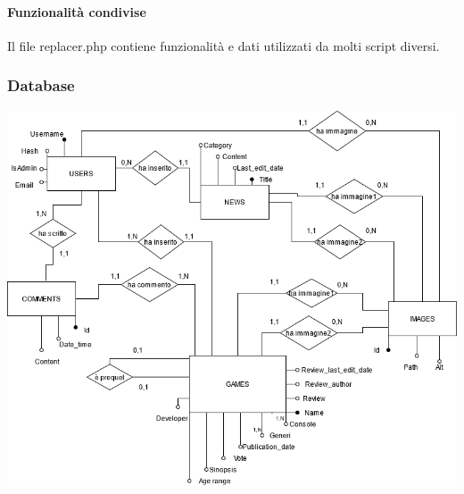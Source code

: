 \paragraph{Funzionalità condivise}
Il file replacer.php contiene funzionalità e dati utilizzati da molti script diversi. 

\subsubsection{Database}


  \includegraphics[width=\linewidth]{./img/diagramma_er.png}
  


